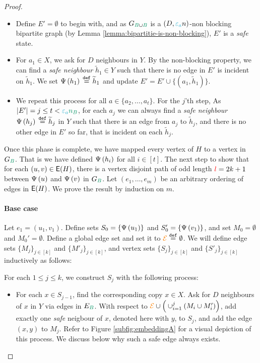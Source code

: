 \documentclass[11pt]{article}
\begin{document}
\begin{proof}
\begin{itemize}
\item Define $E' = \emptyset$ to begin with, and as $\BipartiteG$ is a $(D, \epsilonA n)$-non blocking bipartite graph (by Lemma \ref{lemma:bipartitie-is-non-blocking}), $E'$ is a \emph{safe} state.
  
\item For $a_1 \in X$, we ask for $D$ neighbours in $Y$. By the non-blocking property, we can find a \emph{safe neighbour} $\tilde{h}_1 \in Y$ such that there is no edge in $E'$ is incident on $\tilde{h}_1$. We set $\Psi\left(h_1\right) \text{}\overset{\mathtt{def}}{=} \widetilde{h}_1$ and update $E' = E'  \cup \{(a_1, \tilde{h}_1)\}$.
  
\item We repeat this process for all $a \in \{a_2, \dots, a_t\}$. For the $j$'th step, As $|E'| = j \leq t < \epsilonA\na$, for each $a_j$ we can always find a \emph{safe neighbour} $\Psi\left(h_j\right) \text{}\overset{\mathtt{def}}{=} \widetilde{h}_j$ in $Y$ such that there is an edge from $a_j$ to $\tilde{h}_j$, and there is no other edge in $E'$ so far, that is incident on each $\tilde{h}_j$.
  
\end{itemize}

Once this phase is complete, we have mapped every vertex of $H$ to a vertex in $G_{\GreenB}$.
That is we have defined $\Psi\left(h_i\right)$ for all $i \in [t]$.
The next step to show that for each $(u,v) \in \mathsf{E}(H)$, there is a vertex disjoint path of odd length $\textcolor{red}{l} = 2k+1$ between $\Psi\left(u\right)$ and $\Psi\left(v\right)$ in $G_{\GreenB}$.
Let $(e_1, \dots, e_m)$ be an arbitrary ordering of edges in $\mathsf{E}(H)$.
We prove the result by induction on $m$.

\paragraph{Base case} 

Let $e_1 = (u_1,v_1)$. Define sets $S_0 = \{\Psi\left(u_1\right)\}$ and $S'_0 = \{ \Psi\left(v_1\right)\}$, and set $M_0 = \emptyset$ and $M_0' = \emptyset$.
Define a global edge set and set it to $\textcolor{orange}{\mathcal{E}} \text{}\overset{\mathtt{def}}{=} \emptyset$.
We will define edge sets $\{ M_j\}_{j \in [k]}$ and $ \{ M'_j\}_{j \in [k]}$, and vertex sets $\{ S_j\}_{j \in [k]}$ and $\{ S'_j\}_{j \in [k]}$ inductively as follows:

For each $1 \leq j \leq k$, we construct $S_{j}$ with the following process:

\begin{itemize}
\item {For each $x \in S_{j-1}$, find the corresponding copy $x \in X$. Ask for $D$ neighbours of $x$ in $Y$ via edges in $E_{\GreenB}$.
    With respect to $\textcolor{orange}{\mathcal{E}} \cup \Big(\cup_{i=1}^{j} (M_i \cup M'_i)\Big)$, add exactly one \emph{safe} neigbour of $x$, denoted here with $y$, to $S_{j}$, and add the edge $(x,y)$ to $M_j$. Refer to Figure \ref{subfig:embeddingA} for a visual depiction of this process.
    We discuss below why such a safe edge always exists.}
  

\end{itemize}
\end{proof}
\end{document}
